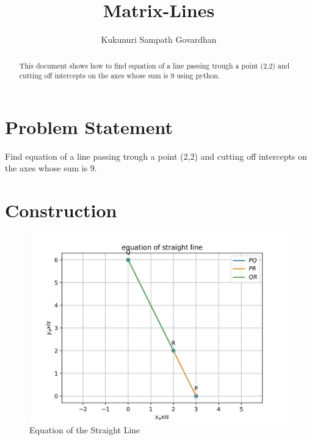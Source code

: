 \documentclass[journal,12pt,twocolumn]{IEEEtran}
\title{
Matrix-Lines
}
\author{Kukunuri Sampath Govardhan}
\begin{document}
\maketitle
\tableofcontents
\begin{abstract}
This document shows how to find equation of a line passing trough a point (2,2) and cutting off intercepts on the axes whose sum is 9 using python.
\end{abstract}
\section{Problem Statement}
Find equation of a line passing trough a point (2,2) and cutting off intercepts on the axes whose sum is 9.\\
\section{Construction}
\begin{figure}[h]
    \centering
\includegraphics[width=\columnwidth]{figs/assign4.png}
    \caption{Equation of the Straight Line}
    \label{fig:my_label}
\end{figure}
\end{document}
